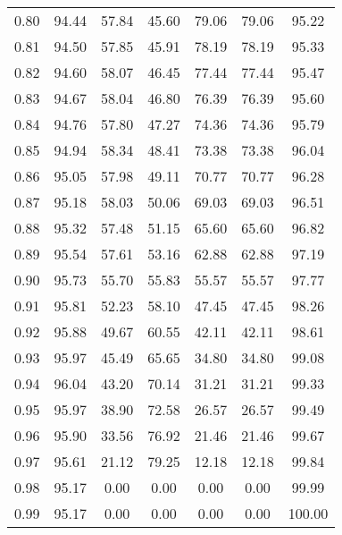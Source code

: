 \begin{tabular}{|c|c|c|c|c|c|c|}
      0.80 &     94.44 &     57.84 &      45.60 &   79.06 &      79.06 &         95.22 \\
      0.81 &     94.50 &     57.85 &      45.91 &   78.19 &      78.19 &         95.33 \\
      0.82 &     94.60 &     58.07 &      46.45 &   77.44 &      77.44 &         95.47 \\
      0.83 &     94.67 &     58.04 &      46.80 &   76.39 &      76.39 &         95.60 \\
      0.84 &     94.76 &     57.80 &      47.27 &   74.36 &      74.36 &         95.79 \\
      0.85 &     94.94 &     58.34 &      48.41 &   73.38 &      73.38 &         96.04 \\
      0.86 &     95.05 &     57.98 &      49.11 &   70.77 &      70.77 &         96.28 \\
      0.87 &     95.18 &     58.03 &      50.06 &   69.03 &      69.03 &         96.51 \\
      0.88 &     95.32 &     57.48 &      51.15 &   65.60 &      65.60 &         96.82 \\
      0.89 &     95.54 &     57.61 &      53.16 &   62.88 &      62.88 &         97.19 \\
      0.90 &     95.73 &     55.70 &      55.83 &   55.57 &      55.57 &         97.77 \\
      0.91 &     95.81 &     52.23 &      58.10 &   47.45 &      47.45 &         98.26 \\
      0.92 &     95.88 &     49.67 &      60.55 &   42.11 &      42.11 &         98.61 \\
      0.93 &     95.97 &     45.49 &      65.65 &   34.80 &      34.80 &         99.08 \\
      0.94 &     96.04 &     43.20 &      70.14 &   31.21 &      31.21 &         99.33 \\
      0.95 &     95.97 &     38.90 &      72.58 &   26.57 &      26.57 &         99.49 \\
      0.96 &     95.90 &     33.56 &      76.92 &   21.46 &      21.46 &         99.67 \\
      0.97 &     95.61 &     21.12 &      79.25 &   12.18 &      12.18 &         99.84 \\
      0.98 &     95.17 &      0.00 &       0.00 &    0.00 &       0.00 &         99.99 \\
      0.99 &     95.17 &      0.00 &       0.00 &    0.00 &       0.00 &        100.00 \\
\bottomrule
\end{tabular}

